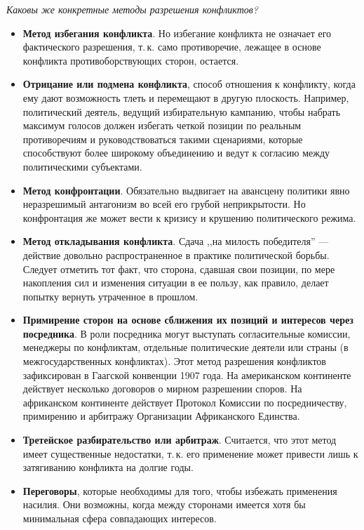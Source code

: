 \documentclass[a4paper,12pt,notitlepage,pdftex,headsepline]{scrartcl}
\begin{document}
  \textit{Каковы же конкретные методы разрешения конфликтов?}
  \begin{itemize}
    \item \textbf{Метод избегания конфликта}.
      Но избегание конфликта не означает его фактического разрешения, т.\,к.
      само противоречие, лежащее в основе конфликта противоборствующих сторон,
      остается.
    \item \textbf{Отрицание или подмена конфликта}, способ отношения к
      конфликту, когда ему дают возможность тлеть и перемещают в другую
      плоскость.
      Например, политический деятель, ведущий избирательную кампанию, чтобы
      набрать максимум голосов должен избегать четкой позиции по реальным
      противоречиям и руководствоваться такими сценариями, которые
      способствуют более широкому объединению и ведут к согласию между
      политическими субъектами.
    \item \textbf{Метод конфронтации}.
      Обязательно выдвигает на авансцену политики явно неразрешимый антагонизм
      во всей его грубой неприкрытости.
      Но конфронтация же может вести к кризису и крушению политического
      режима.
    \item \textbf{Метод откладывания конфликта}.
      Сдача ,,на милость победителя'' --- действие довольно распространенное в
      практике политической борьбы.
      Следует отметить тот факт, что сторона, сдавшая свои позиции, по мере
      накопления сил и изменения ситуации в ее пользу, как правило, делает
      попытку вернуть утраченное в прошлом.
    \item \textbf{Примирение сторон на основе сближения их позиций и интересов
      через посредника}.
      В роли посредника могут выступать согласительные комиссии, менеджеры по
      конфликтам, отдельные политические деятели или страны (в
      межгосударственных конфликтах).
      Этот метод разрешения конфликтов зафиксирован в Гаагской конвенции 1907
      года.
      На американском континенте действует несколько договоров о мирном
      разрешении споров.
      На африканском континенте действует Протокол Комиссии по посредничеству,
      примирению и арбитражу Организации Африканского Единства.
    \item \textbf{Третейское разбирательство или арбитраж}.
      Считается, что этот метод имеет существенные недостатки, т.\,к. его
      применение может привести лишь к затягиванию конфликта на долгие годы.
    \item \textbf{Переговоры}, которые необходимы для того, чтобы избежать
      применения насилия.
      Они возможны, когда между сторонами имеется хотя бы минимальная сфера
      совпадающих интересов.
  \end{itemize}
\end{document}
